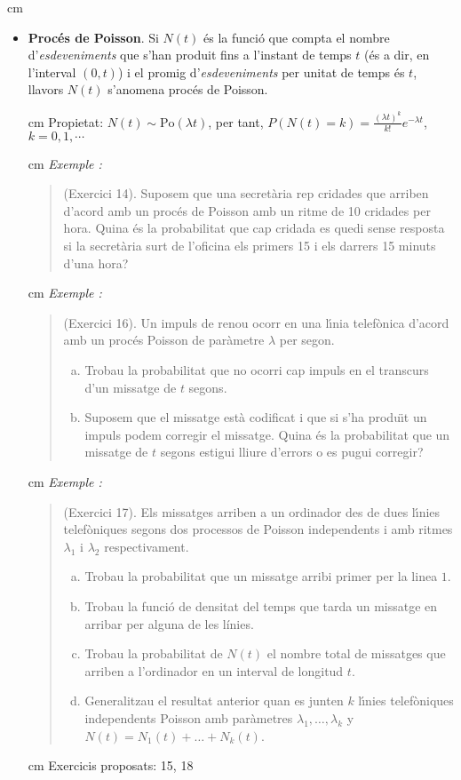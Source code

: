 \documentclass{article}
\newcounter{exctr}
\newenvironment{exemple}
{ \stepcounter{exctr} 
\hspace{0.2cm} 
\textit{Exemple  \arabic{exctr}: }
\it
\begin{quotation}
}{\end{quotation}}
\begin{document}
 cm
\begin{itemize}

\item \textbf{Proc\'es de Poisson}. Si $N(t)$ \'es la funci\'o que compta
el nombre d'\textit{esdeveniments} que s'han produit fins a l'instant de temps $t$
(\'es a dir, en l'interval $(0, t)$) i el promig d'\textit{esdeveniments} per
unitat de temps \'es $t$, llavors $N(t)$ s'anomena proc\'es de Poisson.

 cm
Propietat: $N(t) \sim \mathrm{Po}(\lambda t)$, per tant, 
$\displaystyle P(N(t) = k)=\frac{(\lambda t)^k}{k!} e^{-\lambda t}$, $k=0, 1, \cdots$


 cm
\begin{exemple}
(Exercici 14).
Suposem que una secret\`aria rep cridades  que  arriben
d'acord amb un proc\'es de Poisson amb un ritme de 10 cridades per
hora. Quina \'es la probabilitat  que cap cridada es quedi sense
resposta si la secret\`aria surt de l'oficina els primers 15 i els
darrers 15 minuts d'una hora?
\end{exemple}

 cm
\begin{exemple}
(Exercici 16).
Un impuls de renou ocorr en una l\'{\i}nia telef\`onica d'acord amb
un proc\'es Poisson de par\`ametre $\lambda$ per segon.
\begin{enumerate}[a)]
\item Trobau la probabilitat  que no ocorri cap impuls
en  el transcurs d'un missatge de $t$ segons.
\item Suposem que el missatge est\`a codificat i que si s'ha
produ\"{\i}t un impuls podem corregir el missatge. Quina \'es la
probabilitat  que un missatge de $t$ segons estigui lliure
d'errors o es pugui corregir?
\end{enumerate}
\end{exemple}


 cm
\begin{exemple}
(Exercici 17).
Els missatges arriben a un ordinador des de dues l\'{\i}nies
telef\`oniques segons dos processos de Poisson independents i amb
ritmes $\lambda_{1}$ i $\lambda_{2}$ respectivament.
\begin{enumerate}[a)]
\item Trobau la probabilitat  que un missatge arribi primer per la
  linea $1$.
\item  Trobau la funci\'o de densitat del temps que tarda un
  missatge en arribar per alguna de les l\'inies.
\item Trobau la probabilitat de $N(t)$ el nombre total de
  missatges
  que arriben a l'ordinador en un interval de longitud $t$.
\item  Generalitzau el resultat anterior quan es junten $k$
  l\'{\i}nies telef\`oniques independents Poisson amb par\`ametres
  $\lambda_{1},\ldots,\lambda_{k}$ y
  $N(t)=N_{1}(t)+\ldots+N_{k}(t)$.
\end{enumerate}
\end{exemple}

 cm
Exercicis proposats: 15, 18

\end{itemize}
\end{document}
